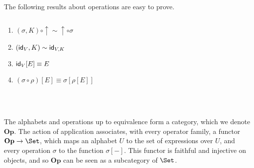The following results about operations are easy to prove.
\begin{lemma}$ $
  \begin{enumerate}
  \item $(\sigma , K) \circ \uparrow \sim \uparrow \circ \sigma$
  \item $(\mathsf{id}_{V} , K) \sim \mathsf{id}_{V,K}$
  \item $\mathsf{id}_{V}[E] \equiv E$
  \item $(\sigma \circ \rho)[E] \equiv \sigma[\rho[E]]$
  \end{enumerate}
\end{lemma}

\begin{code}%
\>[0]\<[2]%
\>[2] \AgdaSymbol{:}  \AgdaSymbol{\{}\AgdaSymbol{\}} \AgdaSymbol{\{}\AgdaSymbol{\}} \AgdaSymbol{\{}\AgdaSymbol{\}} \AgdaSymbol{\{}\AgdaSymbol{\}} \AgdaSymbol{\{}\AgdaSymbol{\}}\<%
\\
\>[2]\<[4]%
\>[4]\AgdaSymbol{\{} \AgdaSymbol{:}   \AgdaSymbol{\}} \AgdaSymbol{(} \AgdaSymbol{:}    \AgdaSymbol{)} \<%
\\
\>[2]\<[4]%
\>[4] \AgdaSymbol{(}  \AgdaSymbol{)} \AgdaSymbol{(}  \AgdaSymbol{)}    \AgdaSymbol{(}  \AgdaSymbol{)}\<%
\end{code}


\newcommand{\Op}{\ensuremath{\mathbf{Op}}}

The alphabets and operations up to equivalence form
a category, which we denote $\Op$.
The action of application associates, with every operator family, a functor $\Op \rightarrow \Set$,
which maps an alphabet $U$ to the set of expressions over $U$, and every operation $\sigma$ to the function $\sigma[-]$.
This functor is faithful and injective on objects, and so $\Op$ can be seen as a subcategory of $\Set$.

